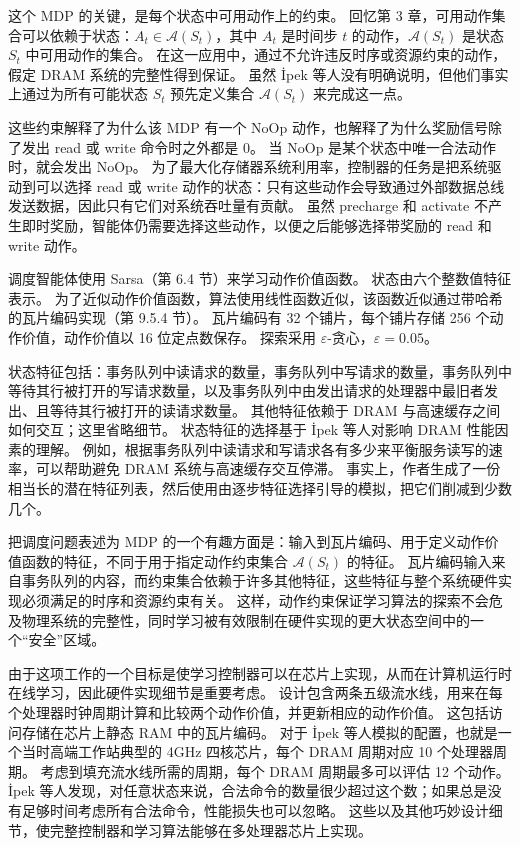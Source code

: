 \documentclass[UTF8,12pt,a4paper,fontset=fandol]{ctexart}
\begin{document}
这个 MDP 的关键，是每个状态中可用动作上的约束。
回忆第 3 章，可用动作集合可以依赖于状态：$A_t\in\mathcal{A}(S_t)$，其中 $A_t$ 是时间步 $t$ 的动作，$\mathcal{A}(S_t)$ 是状态 $S_t$ 中可用动作的集合。
在这一应用中，通过不允许违反时序或资源约束的动作，假定 DRAM 系统的完整性得到保证。
虽然 \.{I}pek 等人没有明确说明，但他们事实上通过为所有可能状态 $S_t$ 预先定义集合 $\mathcal{A}(S_t)$ 来完成这一点。

这些约束解释了为什么该 MDP 有一个 NoOp 动作，也解释了为什么奖励信号除了发出 read 或 write 命令时之外都是 0。
当 NoOp 是某个状态中唯一合法动作时，就会发出 NoOp。
为了最大化存储器系统利用率，控制器的任务是把系统驱动到可以选择 read 或 write 动作的状态：只有这些动作会导致通过外部数据总线发送数据，因此只有它们对系统吞吐量有贡献。
虽然 precharge 和 activate 不产生即时奖励，智能体仍需要选择这些动作，以便之后能够选择带奖励的 read 和 write 动作。

调度智能体使用 Sarsa（第 6.4 节）来学习动作价值函数。
状态由六个整数值特征表示。
为了近似动作价值函数，算法使用线性函数近似，该函数近似通过带哈希的瓦片编码实现（第 9.5.4 节）。
瓦片编码有 32 个铺片，每个铺片存储 256 个动作价值，动作价值以 16 位定点数保存。
探索采用 $\varepsilon$-贪心，$\varepsilon=0.05$。

状态特征包括：事务队列中读请求的数量，事务队列中写请求的数量，事务队列中等待其行被打开的写请求数量，以及事务队列中由发出请求的处理器中最旧者发出、且等待其行被打开的读请求数量。
其他特征依赖于 DRAM 与高速缓存之间如何交互；这里省略细节。
状态特征的选择基于 \.{I}pek 等人对影响 DRAM 性能因素的理解。
例如，根据事务队列中读请求和写请求各有多少来平衡服务读写的速率，可以帮助避免 DRAM 系统与高速缓存交互停滞。
事实上，作者生成了一份相当长的潜在特征列表，然后使用由逐步特征选择引导的模拟，把它们削减到少数几个。

把调度问题表述为 MDP 的一个有趣方面是：输入到瓦片编码、用于定义动作价值函数的特征，不同于用于指定动作约束集合 $\mathcal{A}(S_t)$ 的特征。
瓦片编码输入来自事务队列的内容，而约束集合依赖于许多其他特征，这些特征与整个系统硬件实现必须满足的时序和资源约束有关。
这样，动作约束保证学习算法的探索不会危及物理系统的完整性，同时学习被有效限制在硬件实现的更大状态空间中的一个“安全”区域。

由于这项工作的一个目标是使学习控制器可以在芯片上实现，从而在计算机运行时在线学习，因此硬件实现细节是重要考虑。
设计包含两条五级流水线，用来在每个处理器时钟周期计算和比较两个动作价值，并更新相应的动作价值。
这包括访问存储在芯片上静态 RAM 中的瓦片编码。
对于 \.{I}pek 等人模拟的配置，也就是一个当时高端工作站典型的 4GHz 四核芯片，每个 DRAM 周期对应 10 个处理器周期。
考虑到填充流水线所需的周期，每个 DRAM 周期最多可以评估 12 个动作。
\.{I}pek 等人发现，对任意状态来说，合法命令的数量很少超过这个数；如果总是没有足够时间考虑所有合法命令，性能损失也可以忽略。
这些以及其他巧妙设计细节，使完整控制器和学习算法能够在多处理器芯片上实现。
\end{document}
